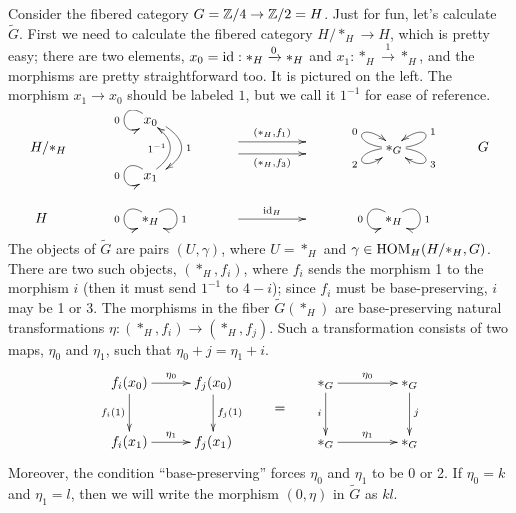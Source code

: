  \begin{example}
   Consider the fibered category $G=\mathbb{Z}/4 \to \mathbb{Z}/2=H$. Just for fun, let's calculate
   $\tilde G$. First we need to calculate the fibered category $H/\ast_H\to H$, which is
   pretty easy; there are two elements, $x_0=\operatorname{id}:\ast_H\xrightarrow{0} \ast_H$ and
   $x_1:\ast_H\xrightarrow 1 \ast_H$, and the morphisms are pretty straightforward too.
   It is pictured on the left. The morphism $x_1\to x_0$ should be labeled $1$, but we
   call it $1^{-1}$ for ease of reference.
   \[\xymatrix@R-1.5pc @C+2pc{
     & x_0 \ar@(ul,dl)_0 \ar@/^4.5ex/@<3pt>[dd]^1\\
    H/\ast_H  & & \ar@<1ex>[r]^{(\ast_H,f_1)} \ar@<-1ex>[r]_{(\ast_H,f_3)} & &
        \ast_G \ar@(l,ul)^0 \ar@(l,dl)_2
               \ar@(r,ur)_1 \ar@(r,dr)^3 & G \\
    & x_1 \ar@(ul,dl)_0 \ar@/_4ex/@<3pt>[uu]^{1^{-1}} \\ \\
    H\quad & \ast_H \ar@(ul,dl)_0 \ar@(ur,dr)^1 & \ar[r]^{\id_H} & &
    \ast_H \ar@(ul,dl)_0 \ar@(ur,dr)^1
   }\]
    The objects of $\tilde G$ are pairs $(U,\gamma)$, where $U=\ast_H$ and $\gamma\in
   \operatorname{HOM}_H(H/\ast_H,G)$. There are two such objects, $(\ast_H,f_i)$, where $f_i$ sends the
   morphism 1 to the morphism $i$ (then it must send $1^{-1}$ to $4-i$); since $f_i$ must
   be base-preserving, $i$ may be 1 or 3. The morphisms in the fiber $\tilde G(\ast_H)$
   are base-preserving natural transformations $\eta:(\ast_H,f_i)\to (\ast_H,f_j)$. Such
   a transformation consists of two maps, $\eta_0$ and $\eta_1$, such that
   $\eta_0+j=\eta_1+i$.
   \[\xymatrix@!0 @R=3.5pc @C=5pc{
    f_i(x_0) \ar[r]^{\eta_0} \ar[d]_{f_i(1)} & f_j(x_0) \ar[d]^{f_j(1)}\\
    f_i(x_1) \ar[r]^{\eta_1} & f_j(x_1)
   }\raisebox{-1.5pc}{$\qquad=\qquad$}
   \xymatrix@!0 @R=3.5pc @C=5pc{
    \ast_G \ar[r]^{\eta_0} \ar[d]_i & \ast_G \ar[d]^j\\
    \ast_G \ar[r]^{\eta_1} & \ast_G
   }\]
    Moreover, the condition ``base-preserving'' forces $\eta_0$ and $\eta_1$ to be 0 or
   2. If $\eta_0=k$ and $\eta_1=l$, then we will write the morphism $(0,\eta)$ in $\tilde
   G$ as $kl$.


\end{example}
